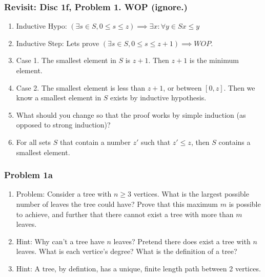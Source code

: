 \documentclass{beamer}
\begin{document}
\begin{frame}
    \frametitle{Revisit: Disc 1f, Problem 1. WOP (ignore.)}
    \begin{enumerate}[<+->]
        \item Inductive Hypo: $(\exists s \in S, 0 \leq s \leq z) \implies \exists x : \forall y \in S x \leq y$
        \item Inductive Step: Lets prove $(\exists s \in S, 0 \leq s \leq z+1) \implies WOP$.
        \item Case 1. The smallest element in $S$ is $z+1$. Then $z+1$ is the minimum element.
        \item Case 2. The smallest element is less than $z+1$, or between $[0, z]$.
        Then we know a smallest element in $S$ exists by inductive hypothesis.
        \item What should you change so that the proof works by simple induction (as opposed to strong
induction)?
        \item For all sets $S$ that contain a number $z'$ such that $z' \leq z$, then $S$ contains
        a smallest element.

    \end{enumerate}
\end{frame}

\begin{frame}
    \frametitle{Problem 1a}
    \begin{enumerate}[<+->]
        \item Problem: Consider a tree with $n \geq 3$ vertices.
        What is the largest possible number of leaves the tree could have?
        Prove that this maximum $m$ is possible to achieve, and further that there cannot
        exist a tree with more than $m$ leaves.
        \item Hint: Why can't a tree have $n$ leaves? Pretend there does exist a tree
        with $n$ leaves. What is each vertice's degree? What is the definition of a tree?
        \item Hint: A tree, by defintion, has a unique, finite length path between 2 vertices.
    \end{enumerate}
\end{frame}
\end{document}
